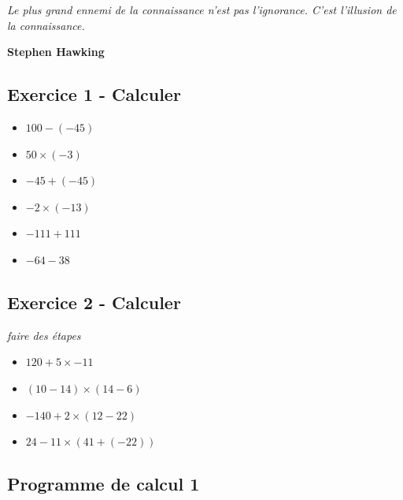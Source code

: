 
\setlength{\columnseprule}{0pt}



\begin{center}
  \textit{Le plus grand ennemi de la connaissance n'est pas l'ignorance. C'est l'illusion de la connaissance.} 
  
  \textbf{Stephen Hawking}
\end{center}


\subsection*{Exercice 1 - Calculer}

\begin{itemize}[label={$\bullet$}]
  \item $ 100 - (-45) $
  \item $ 50 \times (-3) $
  \item $ -45 + (-45) $
  \item $ -2 \times (-13) $
  \item $ -111 + 111 $
  \item $ -64 - 38 $ 
\end{itemize}


\subsection*{Exercice 2 - Calculer}
\textit{faire des étapes}

\begin{itemize}[label={$\bullet$}]
  \item $ 120 + 5 \times -11$
  \item $(10 - 14) \times (14 - 6)$
  \item $-140 + 2 \times (12 - 22)$
  \item $24 - 11 \times (41 + (-22))$
\end{itemize}

\subsection*{Programme de calcul 1}



